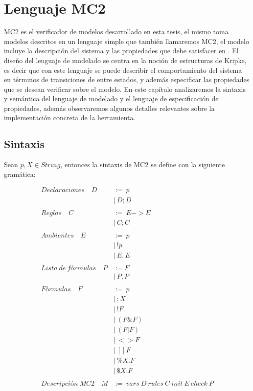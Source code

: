 \chapter{Lenguaje MC2}

MC2 es el verificador de modelos desarrollado en esta tesis, el mismo toma modelos descritos en un lenguaje simple que también llamaremos MC2, el modelo incluye la descripción del sistema y las propiedades que debe satisfacer en {\mucalculo}. El diseño del lenguaje de modelado se centra en la noción de estructuras de Kripke, es decir que con este lenguaje se puede describir el comportamiento del sistema en términos de transiciones de entre estados, y además especificar las propiedades que se desean verificar sobre el modelo. En este capítulo analizaremos la sintaxis y semántica del lenguaje de modelado y el lenguaje de especificación de propiedades, además observaremos algunos detalles relevantes sobre la implementación concreta de la herramienta.

\section{Sintaxis}
Sean $p,X \in String$, entonces la sintaxis de MC2 se define con la siguiente gramática:

\begin{align*}
Declaraciones \quad 
D &:=\ p \\
   &|\ D;D \\
\\
Reglas \quad 
C &:=\ E->E \\
   &|\ C;C \\
\\
Ambientes \quad 
E &:=\ p \\
   &|\ !p \\
   &|\ E,E \\
\\
Lista\ de\ fórmulas \quad 
P &:= F \\
   &|\ P,P \\
\\
Fórmulas \quad 
F &:=\ p \\
   &|\ :X \\
   &|\ !F \\
   &|\ (F \& F) \\
   &|\ (F | F) \\
   &|\ <>F \\
   &|\ []F \\
   &|\ \%X.F \\
   &|\ \$X.F \\ 
\\
Descripción\ MC2 \quad 
M &:=\ vars\ D\ rules\ C\ init\ E\ check\ P \\
\end{align*}

